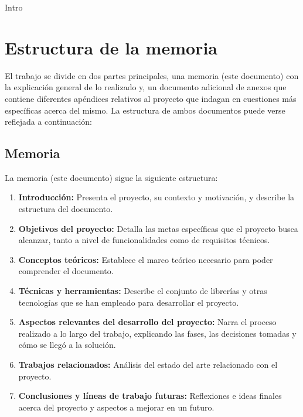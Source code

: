 





Intro

\section{Estructura de la memoria}

El trabajo se divide en dos partes principales, una memoria (este documento) con la explicación general de lo realizado y, un documento adicional de anexos que contiene diferentes apéndices relativos al proyecto que indagan en cuestiones más específicas acerca del mismo. La estructura de ambos documentos puede verse reflejada a continuación:

\subsection{Memoria}

La memoria (este documento) sigue la siguiente estructura:

\begin{enumerate}
	\item \textbf{Introducción:} Presenta el proyecto, su contexto y motivación, y describe la estructura del documento.
	
	\item \textbf{Objetivos del proyecto:} Detalla las metas específicas que el proyecto busca alcanzar, tanto a nivel de funcionalidades como de requisitos técnicos.
	
	\item \textbf{Conceptos teóricos:} Establece el marco teórico necesario para poder comprender el documento.
	
	\item \textbf{Técnicas y herramientas:} Describe el conjunto de librerías y otras tecnologías que se han empleado para desarrollar el proyecto.
	
	\item \textbf{Aspectos relevantes del desarrollo del proyecto:} Narra el proceso realizado a lo largo del trabajo, explicando las fases, las decisiones tomadas y cómo se llegó a la solución.
	
	\item \textbf{Trabajos relacionados:} Análisis del estado del arte relacionado con el proyecto.
	
	\item \textbf{Conclusiones y líneas de trabajo futuras:} Reflexiones e ideas finales acerca del proyecto y aspectos a mejorar en un futuro.
\end{enumerate}

